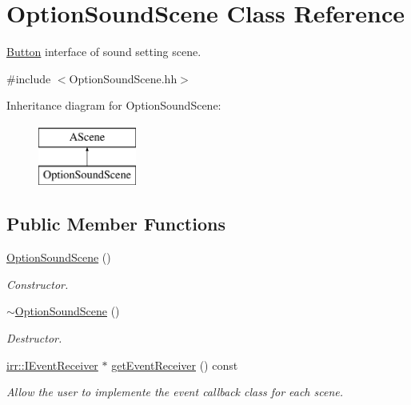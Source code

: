 \hypertarget{classOptionSoundScene}{}\section{Option\+Sound\+Scene Class Reference}
\label{classOptionSoundScene}


\hyperlink{classButton}{Button} interface of sound setting scene.  




{\ttfamily \#include $<$Option\+Sound\+Scene.\+hh$>$}

Inheritance diagram for Option\+Sound\+Scene\+:\begin{figure}[H]
\begin{center}
\leavevmode
\includegraphics[height=2.000000cm]{classOptionSoundScene}
\end{center}
\end{figure}
\subsection*{Public Member Functions}
\begin{DoxyCompactItemize}
\item 
\hyperlink{classOptionSoundScene_abb8409b9b9225118e2779a1e0e7a4b45}{Option\+Sound\+Scene} ()
\begin{DoxyCompactList}\small\item\em Constructor. \end{DoxyCompactList}\item 
\hyperlink{classOptionSoundScene_afaf96649164e48bb5820cca80bc5c024}{$\sim$\+Option\+Sound\+Scene} ()
\begin{DoxyCompactList}\small\item\em Destructor. \end{DoxyCompactList}\item 
\hyperlink{classirr_1_1IEventReceiver}{irr\+::\+I\+Event\+Receiver} $\ast$ \hyperlink{classOptionSoundScene_ac71da65763f0db4b05fc32444308b677}{get\+Event\+Receiver} () const
\begin{DoxyCompactList}\small\item\em Allow the user to implemente the event callback class for each scene. \end{DoxyCompactList}\end{DoxyCompactItemize}


